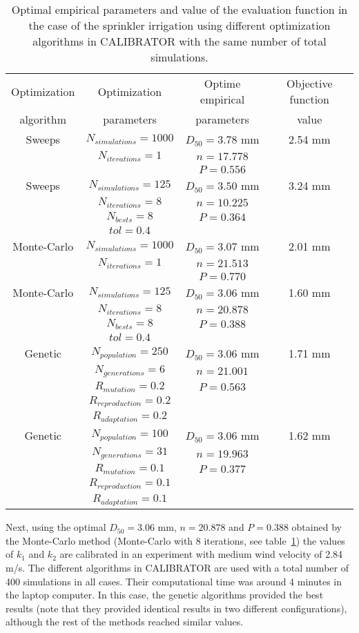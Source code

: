 \documentclass[review,authoryear]{elsarticle}
\newcommand{\TABLE}[5]
{
	\begin{table}[ht!]
		\centering
		\caption{#4.\label{#5}}
		#1
		\begin{tabular}{#2}
			#3
		\end{tabular}
	\end{table}
}
\begin{document}
\TABLE{\scriptsize}{cccc}
{
	Optimization & Optimization & Optime empirical & Objective function
	\\ algorithm & parameters & parameters & value
	\\ \hline
	Sweeps & $N_{simulations}=1000$ & $D_{50}=3.78$ mm & 2.54 mm
	\\ & $N_{iterations}=1$ & $n=17.778$
	\\ & & $P=0.556$
	\\ \hline
	Sweeps & $N_{simulations}=125$ & $D_{50}=3.50$ mm & 3.24 mm
	\\ & $N_{iterations}=8$ & $n=10.225$
	\\ & $N_{bests}=8$ & $P=0.364$
	\\ & $tol=0.4$
	\\ \hline
	Monte-Carlo & $N_{simulations}=1000$ & $D_{50}=3.07$ mm & 2.01 mm
	\\ & $N_{iterations}=1$ & $n=21.513$
	\\ & & $P=0.770$
	\\ \hline
	Monte-Carlo & $N_{simulations}=125$ & $D_{50}=3.06$ mm & 1.60 mm
	\\ & $N_{iterations}=8$ & $n=20.878$
	\\ & $N_{bests}=8$ & $P=0.388$
	\\ & $tol=0.4$
	\\ \hline
	Genetic & $N_{population}=250$ & $D_{50}=3.06$ mm & 1.71 mm
	\\ & $N_{generations}=6$ & $n=21.001$
	\\ & $R_{mutation}=0.2$ & $P=0.563$
	\\ & $R_{reproduction}=0.2$
	\\ & $R_{adaptation}=0.2$
	\\ \hline
	Genetic & $N_{population}=100$ & $D_{50}=3.06$ mm & 1.62 mm
	\\ & $N_{generations}=31$ & $n=19.963$
	\\ & $R_{mutation}=0.1$ & $P=0.377$
	\\ & $R_{reproduction}=0.1$
	\\ & $R_{adaptation}=0.1$
	\\ \hline
}{Optimal empirical parameters and value of the evaluation function in the case of the sprinkler irrigation
using different optimization algorithms in CALIBRATOR with the same number of total simulations}{TabSprinklerI}

Next, using the optimal $D_{50}=3.06$ mm, $n=20.878$ and $P=0.388$ obtained by the Monte-Carlo method (Monte-Carlo with 8 iterations, see table~\ref{TabSprinklerI}) the values of $k_1$ and $k_2$ are calibrated in an experiment with medium wind velocity of 2.84 m/s. The different algorithms in CALIBRATOR are used with a total number of 400 simulations in all cases. Their computational time was around 4 minutes in the laptop computer. In this case, the genetic algorithms provided the best results  (note that they provided identical results in two different configurations), although the rest of the methods reached similar values.
\end{document}
